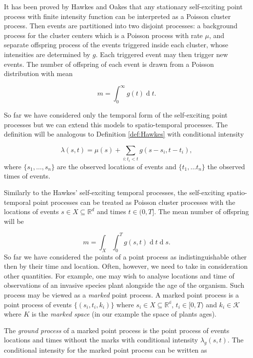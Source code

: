 \documentclass[11pt,a4paper]{article}
\renewcommand{\d}[1]{\ensuremath{\operatorname{d}\!{#1}}}
\begin{document}
It has been proved by Hawkes and Oakes \cite{Hawkes74} that any stationary self-exciting point process with finite intensity function can be interpreted as a Poisson cluster process. Then events are partitioned into two disjoint processes: a background process for the cluster centers which is a Poisson process with rate $\mu$, and separate offspring process of the events triggered inside each cluster, whose intensities are determined by $g$. Each triggered event may then trigger new events. The number of offspring of each event is drawn from a Poisson distribution with mean 

\begin{equation*}
    m = \int_0^\infty g(t) \d t.
\end{equation*}

So far we have considered only the temporal form of the self-exciting point processes but we can extend this models to spatio-temporal processes. The definition will be analogous to Definition \ref{def:Hawkes} with conditional intensity

\begin{equation*}
    \lambda(s, t) = \mu(s) + \sum_{i:t_i<t} g(s - s_i, t - t_i),
\end{equation*}
where $\{ s_1, \dots, s_n \}$ are the observed locations of events and $\{t_1, \dots t_n \}$ the observed times of events. 

Similarly to the Hawkes' self-exciting temporal processes, the self-exciting spatio-temporal point processes can be treated as Poisson cluster processes with the locations of events $s \in X \subseteq \mathbb{R}^d$ and times $t \in (0, T]$. The mean number of offspring will be

\begin{equation}\label{eq:meanoffsp}
    m = \int_X \int_0^T g(s, t) \d t \d s.
\end{equation}
So far we have considered the points of a point process as indistinguishable other then by their time and location. Often, however, we need to take in consideration other quantities. For example, one may wish to analyse locations and time of observations of an invasive species plant alongside the age of the organism. Such process may be viewed as a \textit{marked} point process. A marked point process is a point process of events $\{ (s_i, t_i, k_i ) \}$ where  $s_i \in X \subseteq \mathbb{R^d}$, $t_i \in [0, T)$ and $k_i \in \mathcal{K}$ where $K$ is the \textit{marked space} (in our example the space of plants ages).

The \textit{ground process} of a marked point process is the point process of events locations and times without the marks with conditional intensity $\lambda_g(s, t)$. The conditional intensity for the marked point process can be written as
\end{document}
